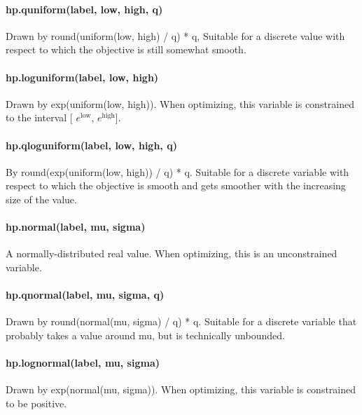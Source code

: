 \documentclass[]{scrartcl}
\begin{document}
        \paragraph{hp.quniform(label, low, high, q)}
                        Drawn by round(uniform(low, high) / q) * q, Suitable for a
                        discrete value with respect to which the objective is still
                        somewhat smooth.

        \paragraph{hp.loguniform(label, low, high)}
                        Drawn by exp(uniform(low, high)). When optimizing, this
                        variable is constrained to the interval [ $e^\mathrm{low}$,
                        $e^\mathrm{high}$].

        \paragraph{hp.qloguniform(label, low, high, q)}
                        By round(exp(uniform(low, high)) / q) * q. Suitable for a
                        discrete variable with respect to which the objective is
                        smooth and gets smoother with the increasing size of the
                        value.

        \paragraph{hp.normal(label, mu, sigma)}
                        A normally-distributed real value. When optimizing, this is
                        an unconstrained variable.

        \paragraph{hp.qnormal(label, mu, sigma, q)}
                        Drawn by round(normal(mu, sigma) / q) * q. Suitable for a
                        discrete variable that probably takes a value around mu, but
                        is technically unbounded.

        \paragraph{hp.lognormal(label, mu, sigma)}
                        Drawn by exp(normal(mu, sigma)). When optimizing, this
                        variable is constrained to be positive.
\end{document}
